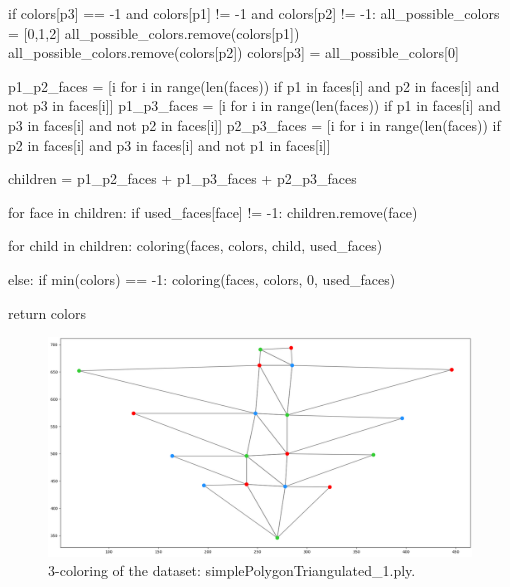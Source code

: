 \documentclass[english, fontsize=12pt, paper=a4, twoside=false, draft=true, pagesize=auto, version=last, DIV=16]{scrartcl}
\theoremstyle{break}
\begin{document}
\begin{landscape}
\begin{python}
            if colors[p3] == -1 and colors[p1] != -1 and colors[p2] != -1:
                all_possible_colors = [0,1,2]
                all_possible_colors.remove(colors[p1])
                all_possible_colors.remove(colors[p2])
                colors[p3] = all_possible_colors[0]

            p1_p2_faces = [i for i in range(len(faces)) if p1 in faces[i] and p2 in faces[i] and not p3 in faces[i]]
            p1_p3_faces = [i for i in range(len(faces)) if p1 in faces[i] and p3 in faces[i] and not p2 in faces[i]]
            p2_p3_faces = [i for i in range(len(faces)) if p2 in faces[i] and p3 in faces[i] and not p1 in faces[i]]

            children = p1_p2_faces + p1_p3_faces + p2_p3_faces

            for face in children:
                if used_faces[face] != -1:
                    children.remove(face)


            for child in children:
                coloring(faces, colors, child, used_faces)

    else:
        if min(colors) == -1:
            coloring(faces, colors, 0, used_faces)

    return colors
\end{python}
\end{landscape}
\newpage

\begin{figure}[h!]
\centering
\includegraphics[width=\textwidth]{images/Figure_1.png}
\caption{3-coloring of the dataset: simplePolygonTriangulated\_1.ply.}
\label{fig:task_1_b}
\end{figure}
\vspace*{15mm}
\end{document}
